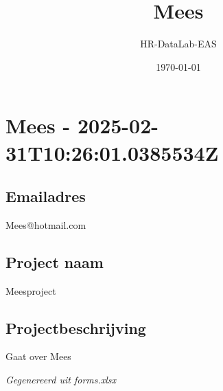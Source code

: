 \documentclass[a4paper,11pt]{article}
\title{Mees}
\author{HR-DataLab-EAS}
\date{\today}
\begin{document}
\maketitle

\section*{Mees - 2025-02-31T10:26:01.0385534Z}
\hrulefill


\subsection*{Emailadres}
Mees@hotmail.com


\subsection*{Project naam}
Meesproject


\subsection*{Projectbeschrijving}
Gaat over Mees


\hrulefill

\textit{Gegenereerd uit forms.xlsx}
\end{document}
